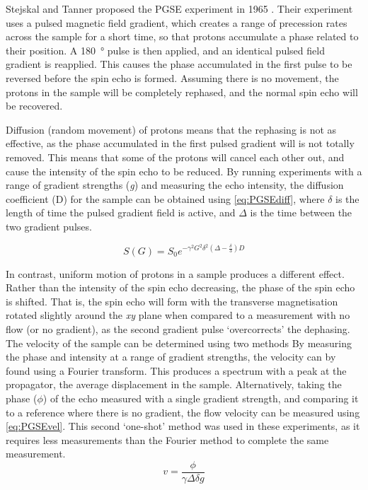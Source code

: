 Stejskal and Tanner proposed the PGSE experiment in 1965 \cite{StejskalSpinDiffusionMeasurements1965}.
Their experiment uses a pulsed magnetic field gradient, which creates a range of precession rates across the sample for a short time, so that protons accumulate a phase related to their position.
A \SI{180}{\degree} pulse is then applied, and an identical pulsed field gradient is reapplied.
This causes the phase accumulated in the first pulse to be reversed before the spin echo is formed.
Assuming there is no movement, the protons in the sample will be completely rephased, and the normal spin echo will be recovered.

Diffusion (random movement) of protons means that the rephasing is not as effective, as the phase accumulated in the first pulsed gradient will is not totally removed.
This means that some of the protons will cancel each other out, and cause the intensity of the spin echo to be reduced.
By running experiments with a range of gradient strengths (\textit{g}) and measuring the echo intensity, the diffusion coefficient (D) for the sample can be obtained using \autoref{eq:PGSEdiff}, where $\delta$ is the length of time the pulsed gradient field is active, and $\Delta$ is the time between the two gradient pulses.

\begin{equation}
S(G) = S_0 e^{-\gamma^2 G^2 \delta^2 (\Delta - \frac{\delta}{3} ) D}
\label{eq:PGSEdiff}
\end{equation}

In contrast, uniform motion of protons in a sample produces a different effect.
Rather than the intensity of the spin echo decreasing, the phase of the spin echo is shifted.
That is, the spin echo will form with the transverse magnetisation rotated slightly around the \textit{xy} plane when compared to a measurement with no flow (or no gradient), as the second gradient pulse `overcorrects' the dephasing.
The velocity of the sample can be determined using two methods \cite{CallaghanVelocitydiffusionimaging1991,XiaOneshotvelocitymicroscopy1992,CallaghanTranslationalDynamicsMagnetic2014}
By measuring the phase and intensity at a range of gradient strengths, the velocity can by found using a Fourier transform.
This produces a spectrum with a peak at the propagator, the average displacement in the sample.
Alternatively, taking the phase ($\phi$) of the echo measured with a single gradient strength, and comparing it to a reference where there is no gradient, the flow velocity can be measured using \autoref{eq:PGSEvel}.
This second `one-shot' method was used in these experiments, as it requires less measurements than the Fourier method to complete the same measurement.
\begin{equation}
v = \frac{\phi}{\gamma \Delta \delta g}
\label{eq:PGSEvel}
\end{equation}


